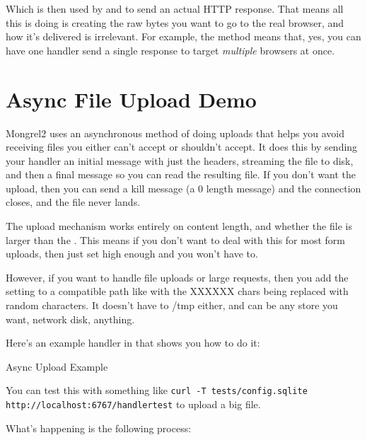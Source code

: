 Which is then used by  and
 to send an actual HTTP response.  That
means all this is doing is creating the raw bytes you want to go
to the real browser, and how it's delivered is irrelevant.  For example,
the  method means that, yes, you can have one
handler send a single response to target \emph{multiple} browsers
at once.


\section{Async File Upload Demo}
\label{sec:async_file_upload_demo}

Mongrel2 uses an asynchronous method of doing uploads that helps you 
avoid receiving files you either can't accept or shouldn't accept.  It does
this by sending your handler an initial message with just the headers, streaming
the file to disk, and then a final message so you can read the resulting file.
If you don't want the upload, then you can send a kill message (a 0 length message)
and the connection closes, and the file never lands.

The upload mechanism works entirely on content length, and whether the file
is larger than the .  This means if you don't
want to deal with this for most form uploads, then just set 
high enough and you won't have to.

However, if you want to handle file uploads or large requests, then you add
the setting  to a  compatible path
like  with the XXXXXX chars being replaced
with random characters.  It doesn't have to /tmp either, and can be any store
you want, network disk, anything.

Here's an example handler in  that shows
you how to do it:

\begin{code}{Async Upload Example}

\end{code}

You can test this with something like
\verb|curl -T tests/config.sqlite http://localhost:6767/handlertest| to upload a big file.

What's happening is the following process:

